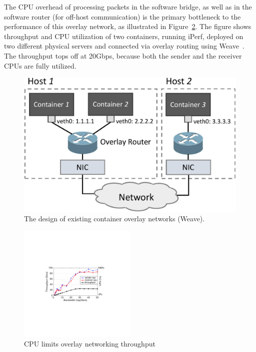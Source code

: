 The CPU overhead of processing packets in the software bridge, as well as in the
software router (for off-host communication) is the primary bottleneck to the
performance of this overlay network, as illustrated in
Figure~\ref{fig:mot_bw_cpu}. The figure shows throughput and CPU utilization of
two containers, running iPerf, deployed on two different physical servers and
connected via overlay routing using Weave~\cite{weave}. The throughput tops off
at 20Gbps, because both the sender and the receiver CPUs are fully utilized.

\begin{figure} [t]
	\centering   
	\includegraphics[width=0.8\linewidth]{figures/overlay-2.pdf}   
	\caption{\label{fig:overlay} The design of existing container overlay networks (Weave).}   
\end{figure}   

\begin{figure}[t]
\centering 
\includegraphics[width=0.5\textwidth]{figures/motivation/mot_bw_cpu.pdf}      
\caption{\label{fig:mot_bw_cpu}CPU limits overlay networking throughput}
\end{figure}
